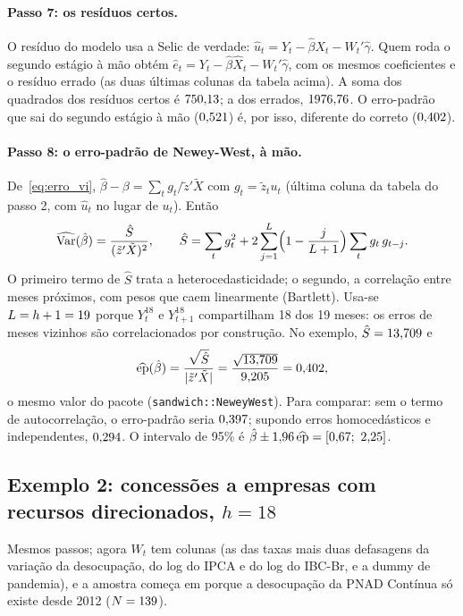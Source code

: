 \paragraph{Passo 7: os resíduos certos.} O resíduo do modelo usa a Selic de verdade:
$\hat u_t = Y_t - \hat\beta X_t - W_t'\hat\gamma$. Quem roda o segundo estágio à mão obtém
$\hat e_t = Y_t - \hat\beta \widehat X_t - W_t'\hat\gamma$, com os mesmos coeficientes e o resíduo
errado (as duas últimas colunas da tabela acima). A soma dos quadrados dos resíduos certos é
$750{,}13$; a dos errados, $1976{,}76$. O erro-padrão que sai do segundo estágio à mão ($0{,}521$) é,
por isso, diferente do correto ($0{,}402$).

\paragraph{Passo 8: o erro-padrão de Newey-West, à mão.} De~\eqref{eq:erro_vi},
$\hat\beta-\beta = \sum_t g_t / \tilde z'\tilde X$ com $g_t=\tilde z_t u_t$ (última coluna da
tabela do passo 2, com $\hat u_t$ no lugar de $u_t$). Então
\begin{equation}\label{eq:nw}
\widehat{\operatorname{Var}}(\hat\beta) = \frac{\hat S}{(\tilde z'\tilde X)^2},\qquad
\hat S = \sum_t g_t^2 + 2\sum_{j=1}^{L}\Bigl(1-\frac{j}{L+1}\Bigr)\sum_t g_t\,g_{t-j}.
\end{equation}
O primeiro termo de $\hat S$ trata a heterocedasticidade; o segundo, a correlação entre meses
próximos, com pesos que caem linearmente (Bartlett). Usa-se $L=h+1=19$ porque $Y^{18}_t$ e
$Y^{18}_{t+1}$ compartilham 18 dos 19 meses: os erros de meses vizinhos são correlacionados por
construção. No exemplo, $\hat S=13{,}709$ e
\[
\widehat{\text{ep}}(\hat\beta)=\frac{\sqrt{\hat S}}{|\tilde z'\tilde X|}=\frac{\sqrt{13{,}709}}{9{,}205}=0{,}402,
\]
o mesmo valor do pacote (\texttt{sandwich::NeweyWest}). Para comparar: sem o termo de
autocorrelação, o erro-padrão seria $0{,}397$; supondo erros homocedásticos e independentes,
$0{,}294$. O intervalo de 95\% é $\hat\beta\pm1{,}96\,\widehat{\text{ep}} = [\IClTL;\ \IChTL]$.

\subsection{Exemplo 2: concessões a empresas com recursos direcionados, $h=18$}
Mesmos passos; agora $W_t$ tem \KwCD{} colunas (as das taxas mais duas defasagens da variação da
desocupação, do log do IPCA e do log do IBC-Br, e a dummy de pandemia), e a amostra começa em
\IniCD{} porque a desocupação da PNAD Contínua só existe desde 2012 ($N=139$).

